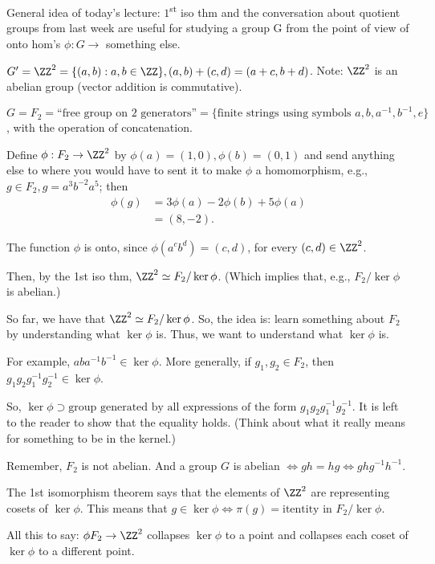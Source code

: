 
General idea of today's lecture: $1$\textsuperscript{st} iso thm and the conversation about quotient groups from last week are useful for studying a group G from the point of view of onto hom's $\phi: G \to$ something else.

\begin{exmp}
	$G' = \ZZ^2 = \{(a, b) : a, b \in \ZZ\}, (a, b) + (c, d) = (a+c, b+d)$. Note:  $\ZZ^2$ is an abelian group (vector addition is commutative).

	$G = F_2 = \text{``free group on $2$ generators''} = \{\text{finite strings using symbols }a, b, a^{-1}, b^{-1}, e\}$, with the operation of concatenation.

	Define $\phi: F_2 \to \ZZ^2$ by $\phi(a) = (1, 0), \phi(b) = (0, 1)$ and send anything else to where you would have to sent it to make $\phi$ a homomorphism, e.g., $g \in F_2, g = a^3 b^{-2} a^5$; then 
	\begin{align*}
		\phi(g) &= 3\phi(a) - 2 \phi(b) + 5\phi(a)\\
				&= (8, -2).
	\end{align*}

	The function $\phi$ is onto, since $\phi(a^c b^d) = (c, d)$, for every $(c, d) \in \ZZ^2$.

	Then, by the 1st iso thm, $\ZZ^2 \simeq F_2/\ker\phi$. (Which implies that, e.g., $F_2/\ker\phi$ is abelian.)

	So far, we have that $\ZZ^2 \simeq F_2/\ker\phi$. So, the idea is: learn something about $F_2$ by understanding what $\ker\phi$ is. Thus, we want to understand what $\ker\phi$ is.
	
	For example, $aba^{-1}b^{-1} \in \ker\phi$. More generally, if $g_1, g_2 \in F_2$, then  $g_1g_2g_1^{-1}g_2^{-1} \in \ker\phi$.

	So,  $\ker\phi \supset \text{group generated by all expressions of the form }g_1g_2g_1^{-1}g_2^{-1}$. 
	It is left to the reader to show that the equality holds.
	(Think about what it really means for something to be in the kernel.)

	Remember, $F_2$ is not abelian. And a group  $G$ is abelian $\iff gh = hg \iff ghg^{-1}h^{-1}$.

	The 1st isomorphism theorem says that the elements of $\ZZ^2$ are representing cosets of $\ker\phi$. This means that $g \in \ker\phi \iff \pi(g) = \text{itentity in } F_2/\ker\phi$. 

	All this to say: $\phi F_2 \to \ZZ^2$ collapses  $\ker\phi$ to a point and collapses each coset of $\ker\phi$ to a different point.


\end{exmp}

